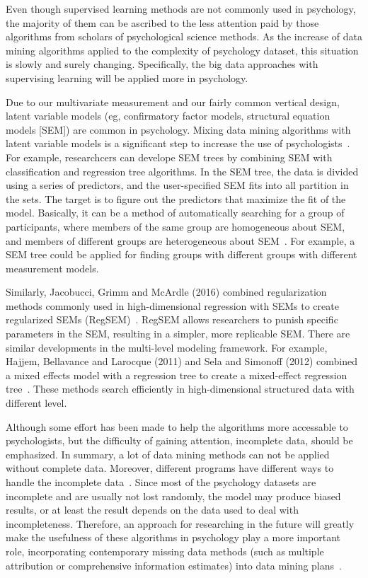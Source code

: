 Even though supervised learning methods are not commonly used in 
psychology, the majority of them can be ascribed to the less 
attention paid by those algorithms from scholars of psychological 
science methods. 
As the increase of data mining algorithms applied to 
the complexity of psychology dataset, this situation is 
slowly and surely changing. Specifically, the big data 
approaches with supervising learning will be applied more in 
psychology.

Due to our multivariate measurement and our fairly common vertical
 design, latent variable models (eg, confirmatory factor models, 
structural equation models [SEM]) are common in psychology. 
Mixing data mining algorithms with latent variable models is a 
significant step to increase the use of 
psychologists~\cite{hid515-11}. 
For example, researchcers can
develope SEM trees by combining SEM with classification and 
regression 
tree algorithms. In the SEM tree, the data is divided using a 
series of predictors, and the user-specified SEM fits into all
partition in the sets. The target is to figure out 
the predictors that 
maximize the fit of the model. Basically, it can be a method of 
automatically searching for a group of participants, where members
 of the same group are homogeneous about SEM, and members of 
different groups are heterogeneous about SEM~\cite{hid515-11}. 
For example, a SEM tree could be applied for
 finding groups with different groups with 
different measurement models.

Similarly, Jacobucci, Grimm and McArdle (2016) combined 
regularization methods commonly used in high-dimensional regression
 with SEMs to create regularized SEMs (RegSEM)~\cite{hid515-11}. 
RegSEM allows 
researchers to punish specific parameters in the SEM, resulting in
 a simpler, more replicable SEM. There are similar developments in
 the multi-level modeling framework. For example, Hajjem, 
Bellavance and Larocque (2011) and Sela and Simonoff (2012) 
combined
 a mixed effects model with a regression tree to create a 
mixed-effect regression tree~\cite{hid515-11}. 
These methods search efficiently in
 high-dimensional structured data with different level.

Although some effort has been made to help the algorithms more 
accessable to psychologists, but the difficulty of gaining 
attention, incomplete data, should be emphasized. 
In summary, a lot of data mining methods can not be applied without
 complete data. Moreover, different programs have different ways to
 handle the incomplete data~\cite{hid515-11}. 
Since most of the psychology datasets are incomplete and are 
usually not lost randomly, 
the model may produce biased results, or at 
least the result depends on the data used to deal with 
incompleteness. Therefore, an approach for researching in the 
future will 
greatly make the usefulness of these algorithms in psychology play 
a more important role, incorporating contemporary missing data methods 
(such as
 multiple attribution or comprehensive information estimates) into
 data mining plans~\cite{hid515-11}.

